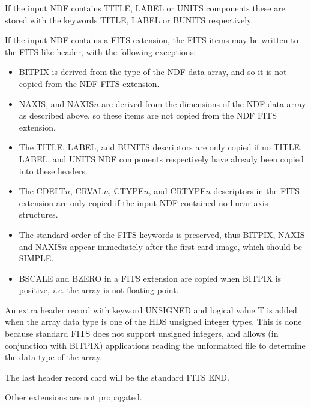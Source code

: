 {{{{            \sstitem
               If the input NDF contains TITLE, LABEL or UNITS components
               these are stored with the keywords TITLE, LABEL or BUNITS
               respectively.

            \sstitem
               If the input NDF contains a FITS extension, the FITS items
               may be written to the FITS-like header, with the following
               exceptions:
               \begin{itemize}
               \item BITPIX is derived from the type of the NDF data array,
               and so it is not copied from the NDF FITS extension.
               \item NAXIS, and NAXIS$n$ are derived from the dimensions of the
               NDF data array as described above, so these items are not
               copied from the NDF FITS extension.
               \item The TITLE, LABEL, and BUNITS descriptors are only copied
               if no TITLE, LABEL, and UNITS NDF components respectively
               have already been copied into these headers.
               \item The CDELT$n$, CRVAL$n$, CTYPE$n$, and CRTYPE$n$ descriptors
               in the FITS extension are only copied if the input NDF
               contained no linear axis structures.
               \item The standard order of the FITS keywords is preserved,
               thus BITPIX, NAXIS and NAXIS$n$ appear immediately after the
               first card image, which should be SIMPLE.
               \item BSCALE and BZERO in a FITS extension are copied when
               BITPIX is positive, {\it i.e.} the array is not floating-point.
               \end{itemize}

            \sstitem
               An extra header record with keyword UNSIGNED and logical
               value T is added when the array data type is one of the HDS
               unsigned integer types.  This is done because standard FITS
               does not support unsigned integers, and allows (in conjunction
               with BITPIX) applications reading the unformatted file to
               determine the data type of the array.

            \sstitem
               The last header record card will be the standard FITS END.
         }

         \sstitem
            Other extensions are not propagated.
      }
   }
}
